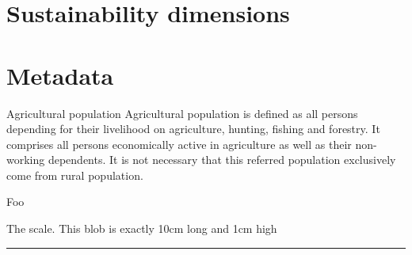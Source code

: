 \documentclass[print,Draft]{faosyb}
\begin{document}

\part[Sustainability dimensions]{Sustain\-ability dimensions}
\lipsum

\KeyResources


\EndPartIntro



\begin{tablepages}
\section{}
\small
  
\clearpage

\end{tablepages}



\part{Metadata}
\EndPartIntro
{}

\begin{metadata}{Agricultural population}
Agricultural population is defined as all persons depending for their livelihood on agriculture, hunting, fishing and forestry. It comprises all persons economically active in agriculture as well as their non-working dependents. It is not necessary that this referred population exclusively come from rural population.
\end{metadata}

\begin{metadata}{Foo}
  \lipsum[1-12]
\end{metadata}


\onecolumn



\clearpage


The scale.  This blob is exactly 10cm long and 1cm high
\rule{10cm}{1cm}
\end{document}
